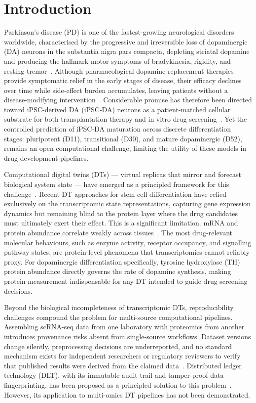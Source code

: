 \documentclass[5p,times,twocolumn]{elsarticle}
\begin{document}
\section{Introduction}

Parkinson's disease (PD) is one of the fastest-growing
neurological disorders worldwide, characterised by the
progressive and irreversible loss of dopaminergic (DA)
neurons in the substantia nigra pars compacta,
depleting striatal dopamine and producing the hallmark
motor symptoms of bradykinesia, rigidity, and resting
tremor~\cite{jang2020current}.
Although pharmacological dopamine replacement therapies
provide symptomatic relief in the early stages of
disease, their efficacy declines over time while
side-effect burden accumulates, leaving patients without
a disease-modifying intervention~\cite{barker2024history}.
Considerable promise has therefore been directed toward
iPSC-derived DA (iPSC-DA) neurons as a patient-matched
cellular substrate for both transplantation therapy
and in vitro drug screening~\cite{oz2023neural}.
Yet the controlled prediction of iPSC-DA maturation
across discrete differentiation stages: pluripotent
(D11), transitional (D30), and mature dopaminergic
(D52), remains an open computational challenge,
limiting the utility of these models in drug
development pipelines.

Computational digital twins (DTs) --- virtual replicas
that mirror and forecast biological system state ---
have emerged as a principled framework for this
challenge~\cite{masison2021modular}.
Recent DT approaches for stem cell differentiation
have relied exclusively on the transcriptomic state
representations, capturing gene expression dynamics
but remaining blind to the protein layer where the drug
candidates must ultimately exert their effect.
This is a significant limitation. mRNA and protein abundance correlate weakly across tissues~\cite{kosti2016cross}. The most drug-relevant molecular behaviours, such as enzyme activity, receptor occupancy, and signalling pathway states, are protein-level phenomena that transcriptomics cannot reliably proxy.
For dopaminergic differentiation specifically,
tyrosine hydroxylase (TH) protein abundance directly
governs the rate of dopamine synthesis, making protein
measurement indispensable for any DT intended to
guide drug screening decisions.

Beyond the biological incompleteness of transcriptomic DTs, reproducibility challenges compound the problem for multi-source computational pipelines.
Assembling scRNA-seq data from one laboratory with proteomics from another introduces provenance risks absent from single-source workflows. Dataset versions change silently, preprocessing decisions are underreported, and no standard mechanism exists for independent researchers or regulatory reviewers to verify that published results were derived from the claimed data~\cite{johns2023data}.
Distributed ledger technology (DLT), with its immutable audit trail and tamper-proof data fingerprinting, has been proposed as a principled solution to this problem~\cite{kuo2017blockchain}. However, its application to multi-omics DT pipelines has not been demonstrated.
\end{document}
